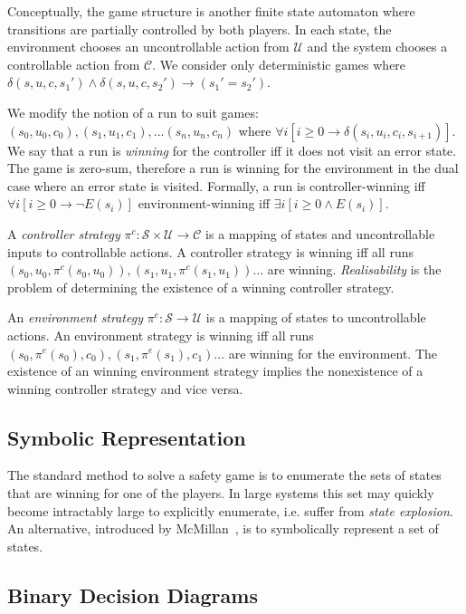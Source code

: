 Conceptually, the game structure is another finite state automaton where transitions are partially controlled by both players. In each state, the environment chooses an uncontrollable action from $\mathcal{U}$ and the system chooses a controllable action from $\mathcal{C}$. We consider only deterministic games where $\delta(s, u, c, s_1') \land \delta(s, u, c, s_2') \to (s_1' = s_2')$. 

We modify the notion of a run to suit games: $(s_0, u_0, c_0), (s_1, u_1, c_1), ... (s_n, u_n, c_n)$ where $\forall i [i \geq 0 \to \delta(s_i, u_i, c_i, s_{i+1})]$. We say that a run is \emph{winning} for the controller iff it does not visit an error state. The game is zero-sum, therefore a run is winning for the environment in the dual case where an error state is visited. Formally, a run is controller-winning iff $\forall i [i \geq 0 \to \lnot E(s_i)]$ environment-winning iff $\exists i [i \geq 0 \land E(s_i)]$.

A \emph{controller strategy} $\pi^c : \mathcal{S} \times \mathcal{U} \to \mathcal{C}$ 
is a mapping of states and uncontrollable inputs to controllable actions. A controller strategy is winning
iff all runs $(s_0, u_0, \pi^c(s_0, u_0)), (s_1, u_1, \pi^c(s_1, u_1)) \dots$ are winning.
\emph{Realisability} is the problem of determining the existence of a winning controller strategy.

An \emph{environment strategy} $\pi^e : \mathcal{S} \to \mathcal{U}$ is a mapping of states to
uncontrollable actions. An environment strategy is winning
iff all runs $(s_0, \pi^e(s_0), c_0), (s_1, \pi^e(s_1), c_1)
\dots$ are winning for the environment. The existence of an winning environment strategy implies the nonexistence of a winning controller strategy and vice versa.

\subsection{Symbolic Representation}

The standard method to solve a safety game is to enumerate the sets of states that are winning for one of the players. In large systems this set may quickly become intractably large to explicitly enumerate, i.e. suffer from \emph{state explosion}. An alternative, introduced by McMillan~\cite{McMillan93}, is to symbolically represent a set of states.

\subsection{Binary Decision Diagrams}

